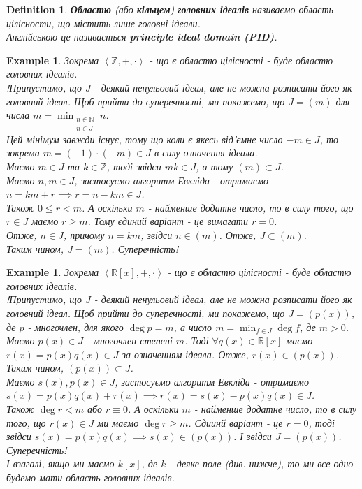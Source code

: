 \documentclass[a4paper, 10pt]{article}
\theoremstyle{theoremdd}
\theoremstyle{theoremdd}
\newtheorem{definition}[theorem]{Definition}
\theoremstyle{theoremdd}
\theoremstyle{theoremdd}
\theoremstyle{theoremdd}
\newtheorem{example}[theorem]{Example}
\theoremstyle{theoremdd}
\theoremstyle{theoremdd}
\theoremstyle{theoremdd}
\theoremstyle{theoremdd}
\theoremstyle{theoremdd}
\theoremstyle{theoremdd}
\theoremstyle{theoremdd}
\theoremstyle{theoremdd}
\theoremstyle{theoremdd}
\theoremstyle{theoremdd}
\begin{document}
\begin{definition}
\textbf{Областю} (або \textbf{кільцем}) \textbf{головних ідеалів} називаємо область цілісности, що містить лише головні ідеали.\\
Англійською це називається \textbf{principle ideal domain (PID)}.
\end{definition}

\begin{example}
Зокрема $\left<\mathbb{Z},+,\cdot \right>$ - що є областю цілісності - буде областю головних ідеалів.\\
!Припустимо, що $J$ - деякий ненульовий ідеал, але не можна розписати його як головний ідеал. Щоб прийти до суперечності, ми покажемо, що $J = (m)$ для числа $m = \displaystyle \min_{\substack{n \in \mathbb{N} \\ n \in J}} n$.\\
Цей мінімум завжди існує, тому що коли є якесь від'ємне число $-m \in J$, то зокрема $m = (-1) \cdot (-m) \in J$ в силу означення ідеала.\\
Маємо $m \in J$ та $k \in \mathbb{Z}$, тоді звідси $mk \in J$, а тому $(m) \subset J$.\\
Маємо $n,m \in J$, застосуємо алгоритм Евкліда - отримаємо\\
$n = km + r \implies r = n - km \in J$.\\
Також $0 \leq r < m$. А оскільки $m$ - найменше додатне число, то в силу того, що $r \in J$ маємо $r \geq m$. Тому єдиний варіант - це вимагати $r = 0$.\\
Отже, $n \in J$, причому $n = km$, звідси $n \in (m)$. Отже, $J \subset (m)$.\\
Таким чином, $J = (m)$. Суперечність!
\end{example}

\begin{example}
Зокрема $\left<\mathbb{R}[x],+,\cdot \right>$ - що є областю цілісності - буде областю головних ідеалів.\\
!Припустимо, що $J$ - деякий ненульовий ідеал, але не можна розписати його як головний ідеал. Щоб прийти до суперечності, ми покажемо, що $J = (p(x))$, де $p$ - многочлен, для якого $\deg p = m$, а число $m = \displaystyle\min_{f \in J} \deg f$, де $m > 0$.\\
Маємо $p(x) \in J$ - многочлен степені $m$. Тоді $\forall q(x) \in \mathbb{R}[x]$ маємо $r(x) = p(x) q(x) \in J$ за означенням ідеала. Отже, $r(x) \in (p(x))$.\\
Таким чином, $(p(x)) \subset J$.\\
Маємо $s(x), p(x) \in J$, застосуємо алгоритм Евкліда - отримаємо\\
$s(x) = p(x)q(x) + r(x) \implies r(x) = s(x) - p(x)q(x) \in J$.\\
Також $\deg r < m$ або $r \equiv 0$. А оскільки $m$ - найменше додатне число, то в силу того, що $r(x) \in J$ ми маємо $\deg r \geq m$. Єдиинй варіант - це $r = 0$, тоді звідси $s(x) = p(x)q(x) \implies s(x) \in (p(x))$. І звідси $J = (p(x))$. Суперечність!
\bigskip \\
І взагалі, якщо ми маємо $k[x]$, де $k$ - деяке поле (див. нижче), то ми все одно будемо мати область головних ідеалів.
\end{example}
\end{document}
